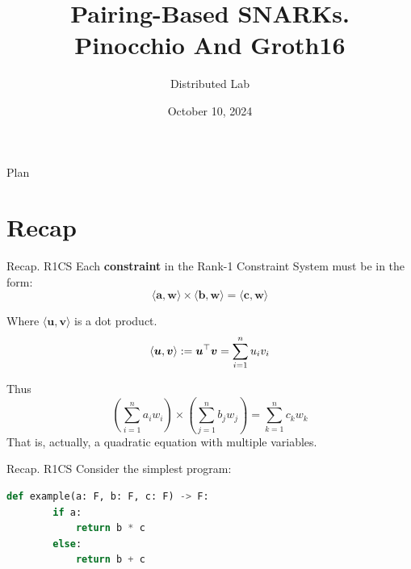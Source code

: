 \documentclass{zkdl-presentation-template}
\title[zk-SNARK: Part III]{\textbf{Pairing-Based SNARKs.\\Pinocchio And Groth16}}
\author{Distributed Lab}
\date{October 10, 2024}
\begin{document}

    \begin{frame}{Plan}
        \tableofcontents
    \end{frame}

    \section{Recap}

    \begin{frame}{Recap. R1CS}
        Each \textbf{constraint} in the Rank-1 Constraint System must be in the form:
        \begin{equation*}
            \langle \boldsymbol{a}, \boldsymbol{w}\rangle \times \langle \boldsymbol{b}, \boldsymbol{w}\rangle = \langle \boldsymbol{c}, \boldsymbol{w}\rangle
        \end{equation*}\pause
        
        Where $\langle \boldsymbol{u}, \boldsymbol{v}\rangle$ is a dot product.
        \vspace{-10pt}
        \begin{equation*}
            \langle \boldsymbol{u}, \boldsymbol{v} \rangle := \boldsymbol{u}^{\top}\boldsymbol{v} = \sum_{i=1}^{n} u_i v_i 
            \vspace{-5pt}
        \end{equation*}\pause
        
        Thus
        \vspace{-5pt}
        \begin{equation*}
            \left(\sum_{i=1}^{n} a_i w_i\right) \times \left(\sum_{j=1}^{n} b_j w_j\right) = \sum_{k=1}^{n} c_k w_k
        \end{equation*}
        That is, actually, a quadratic equation with multiple variables.
    \end{frame}

    \begin{frame}[fragile]{Recap. R1CS}
        Consider the simplest program:
        \vspace{10pt}
        \begin{lstlisting}[language=Python,numbers=none]
    def example(a: F, b: F, c: F) -> F:
        if a:
            return b * c 
        else:
            return b + c
        \end{lstlisting}
    \end{frame}
\end{document}
